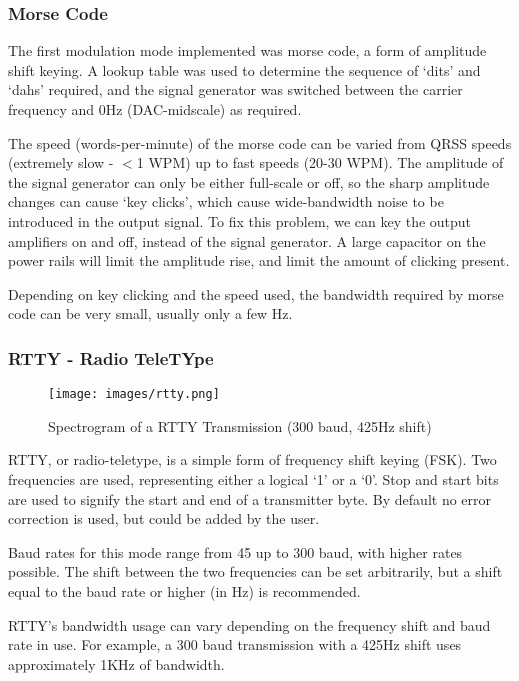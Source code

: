 \documentclass[a4paper,12pt]{article}
\begin{document}
\subsubsection*{Morse Code}
The first modulation mode implemented was morse code, a form of amplitude shift keying. A lookup table was used to determine the sequence of `dits' and `dahs' required, and the signal generator was switched between the carrier frequency and 0Hz (DAC-midscale) as required.

The speed (words-per-minute) of the morse code can be varied from QRSS speeds (extremely slow - $<$1 WPM) up to fast speeds (20-30 WPM). The amplitude of the signal generator can only be either full-scale or off, so the sharp amplitude changes can cause `key clicks', which cause wide-bandwidth noise to be introduced in the output signal. To fix this problem, we can key the output amplifiers on and off, instead of the signal generator. A large capacitor on the power rails will limit the amplitude rise, and limit the amount of clicking present.

Depending on key clicking and the speed used, the bandwidth required by morse code can be very small, usually only a few Hz.

\subsubsection*{RTTY - Radio TeleTYpe}
\begin{figure}[h]
  \begin{center}
    \texttt{[image: images/rtty.png]}
  \end{center}
  \caption{Spectrogram of a RTTY Transmission (300 baud, 425Hz shift)}
  \label{fig:rtty}
\end{figure}
RTTY, or radio-teletype, is a simple form of frequency shift keying (FSK). Two frequencies are used, representing either a logical `1' or a `0'. Stop and start bits are used to signify the start and end of a transmitter byte. By default no error correction is used, but could be added by the user.

Baud rates for this mode range from 45 up to 300 baud, with higher rates possible. The shift between the two frequencies can be set arbitrarily, but a shift equal to the baud rate or higher (in Hz) is recommended.

RTTY's bandwidth usage can vary depending on the frequency shift and baud rate in use. For example, a 300 baud transmission with a 425Hz shift uses approximately 1KHz of bandwidth. 
\end{document}
